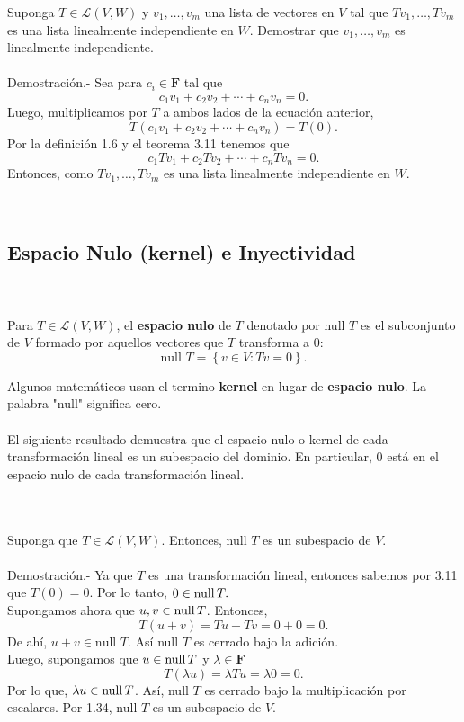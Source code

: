 \begin{lema}
Suponga $T\in \mathcal{L}(V,W)$ y $v_1,\ldots, v_m$ una lista de vectores en $V$ tal que $Tv_1,\ldots,Tv_m$ es una lista linealmente independiente en $W$. Demostrar que $v_1,\ldots,v_m$ es linealmente independiente.\\\\
    Demostración.-\; Sea para $c_i\in \textbf{F}$ tal que 
    $$c_1v_1+c_2v_2+\cdots+c_nv_n=0.$$
    Luego, multiplicamos por $T$ a ambos lados de la ecuación anterior,
    $$T(c_1v_1+c_2v_2+\cdots+c_nv_n)=T(0).$$
    Por la definición 1.6 y el teorema 3.11 tenemos que
    $$c_1Tv_1+c_2Tv_2+\cdots+c_nTv_n=0.$$
    Entonces, como $Tv_1,\ldots,Tv_m$ es una lista linealmente independiente en $W$.
\end{lema}


\;\\
\subsection*{Espacio Nulo (kernel) e Inyectividad}


\begin{mydef}\,\\\\
    Para $T\in \mathcal{L}(V,W)$, el \textbf{espacio nulo} de $T$ denotado por null $T$ es el subconjunto de $V$ formado por aquellos vectores que $T$ transforma a $0$:
    $$\mbox{null } T = \left\{v\in V : Tv=0\right\}.$$
\end{mydef}

Algunos matemáticos usan el termino \textbf{kernel} en lugar de \textbf{espacio nulo}. La palabra "null" significa cero.\\\\

El siguiente resultado demuestra que el espacio nulo o kernel de cada transformación lineal es un subespacio del dominio. En particular, $0$ está en el espacio nulo de cada transformación lineal.

\setcounter{myteo}{13}
\begin{myteo}\,\\\\
    Suponga que $T\in \mathcal{L}(V,W)$. Entonces, null $T$ es un subespacio de $V$.\\\\
	Demostración.-\; Ya que $T$ es una transformación lineal, entonces sabemos por 3.11 que $T(0)=0$. Por lo tanto, $0\in \operatorname{null} T.$\\
	Supongamos ahora que $u,v\in \operatorname{null} T$. Entonces,
	$$T(u+v)=Tu+Tv=0+0=0.$$
	De ahí, $u+v\in \mbox{null } T$. Así null $T$ es cerrado bajo la adición.\\
	Luego, supongamos que $u\in \operatorname{null} T$ y $\lambda \in \textbf{F}$
	$$T(\lambda u)=\lambda T u=\lambda 0 = 0.$$
	Por lo que, $\lambda u \in \operatorname{null} T$. Así, null $T$ es cerrado bajo la multiplicación por escalares. Por 1.34, null $T$ es un subespacio de $V.$
\end{myteo}

